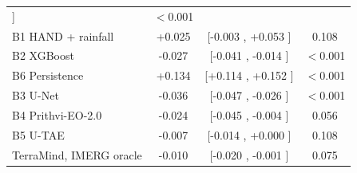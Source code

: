 \begin{tabular}{lccc}
]
& $<$0.001%
\\
B1 HAND + rainfall
& +0.025%
& [-0.003%
, +0.053%
]
& 0.108%
\\
B2 XGBoost
& -0.027%
& [-0.041%
, -0.014%
]
& $<$0.001%
\\
B6 Persistence
& +0.134%
& [+0.114%
, +0.152%
]
& $<$0.001%
\\
B3 U-Net
& -0.036%
& [-0.047%
, -0.026%
]
& $<$0.001%
\\
B4 Prithvi-EO-2.0
& -0.024%
& [-0.045%
, -0.004%
]
& 0.056%
\\
B5 U-TAE
& -0.007%
& [-0.014%
, +0.000%
]
& 0.108%
\\
TerraMind, IMERG oracle
& -0.010%
& [-0.020%
, -0.001%
]
& 0.075%
\\
\bottomrule
\end{tabular}
